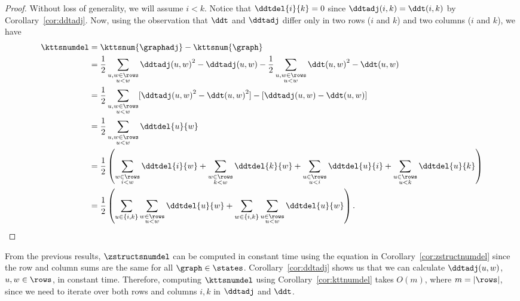 \begin{proof}
	Without loss of generality, we will assume $i < k$. Notice that
	$\ddtdel{i}{k} = 0$ since $\ddtadj(i, k) = \ddt(i, k)$ by
	Corollary~\ref{cor:ddtadj}. Now, using the observation that $\ddt$ and
	$\ddtadj$ differ only in two rows ($i$ and $k$) and two columns ($i$ and
	$k$), we have
	\begin{align*}
		\kttsnumdel &= \kttsnum{\graphadj} - \kttsnum{\graph} \\
							 &= \frac{1}{2} \sum_{\substack{u, w \in \rows \\ u < w}}
							 {\ddtadj(u, w)}^2 - \ddtadj(u, w) - \frac{1}{2}
							 \sum_{\substack{u, w \in \rows \\ u < w}} {\ddt(u, w)}^2 -
							 \ddt(u, w) \\
							 &= \frac{1}{2} \sum_{\substack{u, w \in \rows \\ u < w}}
							 [{\ddtadj(u, w)}^2 - {\ddt(u, w)}^2] - [\ddtadj(u, w) - \ddt(u,
							 w)] \\
							 &= \frac{1}{2} \sum_{\substack{u, w \in \rows \\ u < w}}
							 \ddtdel{u}{w} \\
							 &= \frac{1}{2}\left(\sum_{\substack{w \in \rows \\ i < w}}
							 \ddtdel{i}{w} + \sum_{\substack{w \in \rows \\ k < w}}
							 \ddtdel{k}{w} + \sum_{\substack{u \in \rows \\ u < i}}
							 \ddtdel{u}{i} + \sum_{\substack{u \in \rows \\ u < k}}
							 \ddtdel{u}{k}\right) \\
							 &= \frac{1}{2} \left(\sum_{u \in \{i, k\}} \sum_{\substack{w \in
							 \rows \\ u < w}} \ddtdel{u}{w} + \sum_{w \in \{i, k\}}
							 \sum_{\substack{u \in \rows \\ u < w}} \ddtdel{u}{w}\right).
	\end{align*}
\end{proof}

From the previous results, $\zstructsnumdel$ can be computed in constant time
using the equation in Corollary~\ref{cor:zstructnumdel} since the row and
column sums are the same for all $\graph \in \states$.
Corollary~\ref{cor:ddtadj} shows us that we can calculate $\ddtadj(u, w)$, $u,
w \in \rows$, in constant time. Therefore, computing $\kttsnumdel$ using
Corollary~\ref{cor:kttnumdel} takes $O(m)$, where $m = |\rows|$, since we need
to iterate over both rows and columns $i, k$ in $\ddtadj$ and $\ddt$.

